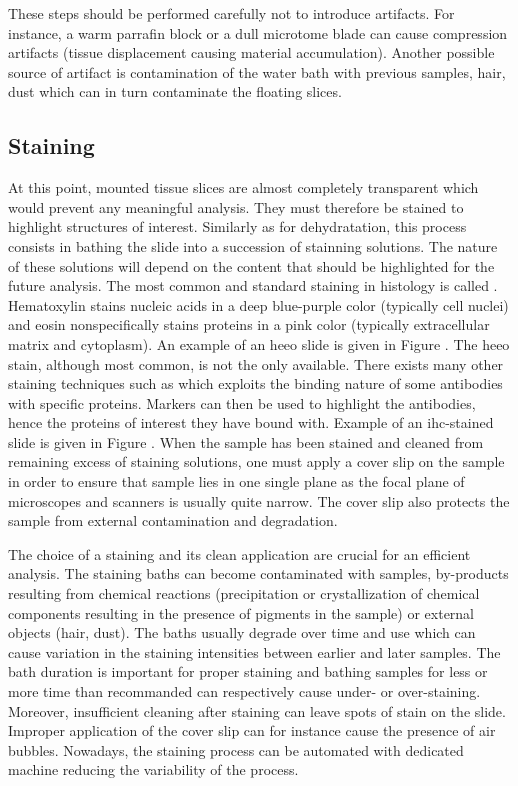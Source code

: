 These steps should be performed carefully not to introduce artifacts. For instance, a warm parrafin block or a dull microtome blade can cause compression artifacts (\ie tissue displacement causing material accumulation). Another possible source of artifact is contamination of the water bath with previous samples, hair, dust which can in turn contaminate the floating slices.   

\subsection{Staining}
\label{ssec:backdp:staining}
At this point, mounted tissue slices are almost completely transparent which would prevent any meaningful analysis. They must therefore be stained to highlight structures of interest. Similarly as for dehydratation, this process consists in bathing the slide into a succession of stainning solutions. The nature of these solutions will depend on the content that should be highlighted for the future analysis. The most common and standard staining in histology is called . Hematoxylin stains nucleic acids in a deep blue-purple color (typically cell nuclei) and eosin nonspecifically stains proteins in a pink color (typically extracellular matrix and cytoplasm). An example of an \acrshort{heeo} slide is given in Figure . The \acrshort{heeo} stain, although most common, is not the only available. There exists many other staining techniques such as  which exploits the binding nature of some antibodies with specific proteins. Markers can then be used to highlight the antibodies, hence the proteins of interest they have bound with. Example of an \acrshort{ihc}-stained slide is given in Figure . When the sample has been stained and cleaned from remaining excess of staining solutions, one must apply a cover slip on the sample in order to ensure that sample lies in one single plane as the focal plane of microscopes and scanners is usually quite narrow. The cover slip also protects the sample from external contamination and degradation. 

The choice of a staining and its clean application are crucial for an efficient analysis. The staining baths can become contaminated with samples, by-products resulting from chemical reactions (\eg precipitation or crystallization of chemical components resulting in the presence of pigments in the sample) or external objects (\eg hair, dust). The baths usually degrade over time and use which can cause variation in the staining intensities between earlier and later samples. The bath duration is important for proper staining and bathing samples for less or more time than recommanded can respectively cause under- or over-staining. Moreover, insufficient cleaning after staining can leave spots of stain on the slide. Improper application of the cover slip can for instance cause the presence of air bubbles. Nowadays, the staining process can be automated with dedicated machine reducing the variability of the process. 

